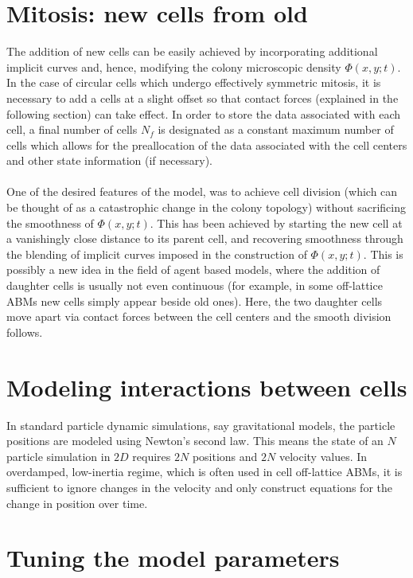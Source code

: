 \section{Mitosis: new cells from old}
The addition of new cells can be easily achieved by incorporating additional implicit curves and, hence, modifying the colony microscopic density $\Phi(x,y;t) $. In the case of circular cells which undergo effectively symmetric mitosis, it is necessary to add a cells at a slight offset so that contact forces (explained in the following section) can take effect. In order to store the data associated with each cell, a final number of cells $N_f$ is designated as a constant maximum number of cells which allows for the preallocation of the data associated with the cell centers and other state information (if necessary). 
\\
\\
One of the desired features of the model, was to achieve cell division (which can be thought of as a catastrophic change in the colony topology)  without sacrificing the smoothness of $\Phi(x,y;t) $. This has been achieved by starting the new cell at a vanishingly close distance to its parent cell, and recovering smoothness through the blending of implicit curves imposed in the construction of $\Phi(x,y;t)$. This is possibly a new idea in the field of agent based models, where the addition of daughter cells is usually not even continuous (for example, in some off-lattice ABMs new cells simply appear beside old ones). Here, the two daughter cells move apart via contact forces between the cell centers and the smooth division follows.

\section{Modeling interactions between cells}
In standard particle dynamic simulations, say gravitational models, the particle positions are modeled using Newton's second law. This means the state of an $N$ particle simulation in $2D$ requires $2N$ positions and $2N$ velocity values. In overdamped, low-inertia regime, which is often used in cell off-lattice ABMs, it is sufficient to ignore changes in the velocity and only construct equations for the change in position over time. 

\section{Tuning the model parameters}

